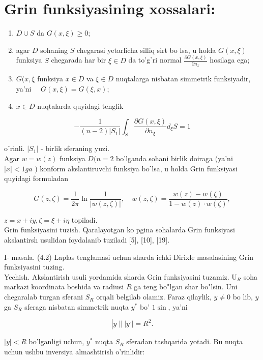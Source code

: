 \documentclass[10pt]{article}
\begin{document}
\section*{Grin funksiyasining xossalari:}
\begin{enumerate}
  \item $D \cup S$ da $G(x, \xi) \geq 0$;
  \item agar $D$ sohaning $S$ chegarasi yetarlicha silliq sirt bo lsa, u holda $G(x, \xi)$ funksiya $S$ chegarada har bir $\xi \in D$ da to'gˋri normal $\frac{\partial G(x, \xi)}{\partial n_{x}}$ hosilaga ega;
  \item $G(x, \xi$ funksiya $x \in D$ va $\xi \in D$ nuqtalarga nisbatan simmetrik funksiyadir, ya'ni $\quad G(x, \xi)=G(\xi, x)$;
  \item $x \in D$ nuqtalarda quyidagi tenglik
\end{enumerate}

$$
-\frac{1}{(n-2)\left|S_{1}\right|} \int_{S} \frac{\partial G(x, \xi)}{\partial n_{\xi}} d_{\xi} S=1
$$

oˋrinli. $\left|S_{1}\right|$ - birlik sferaning yuzi.\\
Agar $w=w(z)$ funksiya $D(n=2$ bo'lganda sohani birlik doiraga (ya'ni $|x|<1 g a$ ) konform akslantiruvchi funksiya boˋlsa, u holda Grin funksiyasi quyidagi formuladan

$$
G(z, \zeta)=\frac{1}{2 \pi} \ln \frac{1}{|w(z, \zeta)|}, \quad w(z, \zeta)=\frac{w(z)-w(\zeta)}{1-w(z) \cdot w(\zeta)},
$$

$z=x+i y, \zeta=\xi+i \eta$ topiladi.\\[0pt]
Grin funksiyasini tuzish. Qaralayotgan ko pgina sohalarda Grin funksiyasi akslantirsh usulidan foydalanib tuziladi [5], [10], [19].

I- masala. (4.2) Laplas tenglamasi uchun sharda ichki Dirixle masalasining Grin funksiyasini tuzing.\\
Yechish. Akslantirish usuli yordamida sharda Grin funksiyasini tuzamiz. $\mathrm{U}_{R}$ soha markazi koordinata boshida va radiusi $R$ ga teng bo"lgan shar bo"lsin. Uni chegaralab turgan sferani $S_{R}$ orqali belgilab olamiz. Faraz qilaylik, $y \neq 0$ bo lib, $y$ ga $S_{R}$ sferaga nisbatan simmetrik nuqta $y^{*}$ bo' $1 \sin$, ya'ni


\begin{equation*}
\left|y \|\left|y^{\cdot}\right|=R^{2} .\right. \tag{4.58}
\end{equation*}


$|y|<R$ bo'lganligi uchun, $y^{*}$ nuqta $S_{R}$ sferadan tashqarida yotadi. Bu nuqta uchun ushbu inversiya almashtirish o'rinlidir:
\end{document}
